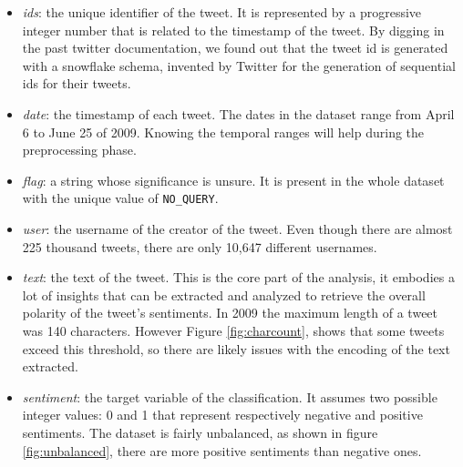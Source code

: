 \documentclass[conference]{IEEEtran}
\begin{document}
\begin{itemize}
    \item \textit{ids}: the unique identifier of the tweet. It is represented by a progressive integer number that is related to the timestamp of the tweet. By digging in the past twitter documentation, we found out that the tweet id is generated with a snowflake schema\cite{snowflake}, invented by Twitter for the generation of sequential ids for their tweets.
    \begin{figure}[h]
        \centering
        
        \label{fig:snowflake}
\end{figure}
    \item \textit{date}: the timestamp of each tweet. %
    The dates in the dataset range from April 6 to June 25 of 2009. Knowing the temporal ranges will help during the preprocessing phase.
    \item \textit{flag}: a string whose significance is unsure. It is present in the whole dataset with the unique value of \texttt{NO\_QUERY}. %
    \item \textit{user}: the username of the creator of the tweet. Even though there are almost 225 thousand tweets, there are only 10,647 different usernames. %
    \item \textit{text}: the text of the tweet. This is the core part of the analysis, it embodies a lot of insights that can be extracted and analyzed to retrieve the overall polarity of the tweet's sentiments. In 2009 the maximum length of a tweet was 140 characters\cite{tweet_lenght}. However Figure \ref{fig:charcount}, shows that some tweets exceed this threshold, so there are likely issues with the encoding of the text extracted.
    \item \textit{sentiment}: the target variable of the classification. It assumes two possible integer values: 0 and 1 that represent respectively negative and positive sentiments. The dataset is fairly unbalanced, as shown in figure \ref{fig:unbalanced}, there are more positive sentiments than negative ones.
\end{itemize}
\end{document}
